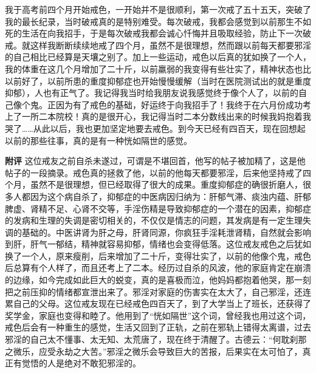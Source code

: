 \begin{case}
    我于高考前四个月开始戒色，一开始并不是很顺利，第一次戒了五十五天，突破了我的最长纪录，当时破戒真的是特别难受。每次破戒，我都会感觉到以前那生不如死的生活在向我招手，于是每次破戒我都会诚心忏悔并且吸取经验，防止下一次破戒。就这样我断断续续地戒了四个月，虽然不是很理想，然而跟以前每天都要邪淫的自己相比已经算是天壤之别了。加上一些运动，戒色以后真的犹如换了一个人，我的体重在这几个月增加了二十斤，以前羸弱的我变得有些壮实了，精神状态也比以前好了，以前所患的重度抑郁症也开始慢慢缓解（当时在医院测试出的就是重度抑郁），人也有正气了。我记得我当时给我朋友说我感觉终于像个人了，以前的自己像个鬼。正因为有了戒色的基础，好运终于向我招手了！我终于在六月份成功考上了一所二本院校！真的是很开心，我记得当时二本分数线出来的时候我妈抱着我哭了……从此以后，我也更加坚定地要去戒色。到今天已经有四百天，现在回想起以前的那些往事，真的是有一种恍如隔世的感觉。

    \textbf{附评} 这位戒友之前自杀未遂过，可谓是不堪回首，他写的帖子被加精了，这是他帖子的一段摘录。戒色真的拯救了他，以前的他每天都要邪淫，后来他坚持戒了四个月，虽然不是很理想，但已经取得了很大的成果。重度抑郁症的确很折磨人，很多人都因为这个病自杀了，抑郁症的中医病因归纳为：肝郁气滞、痰浊内蕴、肝郁脾虚、肾精不足、心肾不交等，手淫伤精是导致抑郁症的一个潜在的因素，抑郁症的发病和生理的失调是密切相关的，不仅仅是情志的问题，其发病是有一定生理失调的基础的。中医讲肾为肝之母，肝肾同源，你疯狂手淫耗泄肾精，自然就会影响到肝，肝气一郁结，精神就容易抑郁，情绪也会变得低落。这位戒友戒色之后犹如换了一个人，原来瘦削，后来增加了二十斤，变得壮实了，以前的他像个鬼，戒色后总算有个人样了，而且还考上了二本。经历过自杀的风波，他的家庭肯定在崩溃的边缘，如今完成如此巨大的蜕变，真的是喜极而泣，他妈妈都抱着他哭，那一刻把之前压抑的情绪都宣泄出来了。邪淫对家庭的伤害实在太大了，自己邪淫，还连累自己的父母。这位戒友现在已经戒色四百天了，到了大学当上了班长，还获得了奖学金，家庭也变得和睦了。他用到了“恍如隔世”这个词，曾经我也用过这个词，戒色后会有一种重生的感觉，生活又回到了正轨，之前在邪轨上错得太离谱，过去邪淫的自己太不懂事、太无知、太荒唐了，现在终于清醒了。古德云：“何耽刹那之微乐，应受永劫之大苦。”邪淫之微乐会导致巨大的苦报，后果实在太可怕了，真正有觉悟的人是绝对不敢犯邪淫的。
\end{case}

